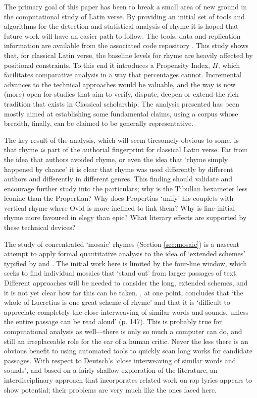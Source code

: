 \documentclass[twocolumn, switch, a4paper]{article} %
\begin{document}
The primary goal of this paper has been to break a small area of new ground in
the computational study of Latin verse. By providing an initial set of tools
and algorithms for the detection and statistical analysis of rhyme it is hoped
that future work will have an easier path to follow. The tools, data and
replication information are available from the associated code repository
\cite{nagy_rhyme_2021}. This study shows that, for classical Latin verse, the
baseline levels for rhyme are heavily affected by positional constraints. To
this end it introduces a Propensity Index, $\Pi$, which facilitates
comparative analysis in a way that percentages cannot. Incremental advances to
the technical approaches would be valuable, and the way is now (more) open for
studies that aim to verify, dispute, deepen or extend the rich tradition that
exists in Classical scholarship. The analysis presented has been mostly aimed
at establishing some fundamental claims, using a corpus whose breadth, finally,
can be claimed to be generally representative.

The key result of the analysis, which will seem tiresomely obvious to some, is
that rhyme \emph{is} part of the authorial fingerprint for classical Latin
verse. Far from the idea that authors avoided rhyme, or even the idea that
`rhyme simply happened by chance' it is clear that rhyme was used differently
by different authors and differently in different genres. This finding should
validate and encourage further study into the particulars; why is the Tibullan
hexameter less leonine than the Propertian? Why does Propertius `unify' his
couplets with vertical rhyme where Ovid is more inclined to link them? Why is
line-initial rhyme more favoured in elegy than epic? What literary effects are
supported by these technical devices? 

The study of concentrated `mosaic' rhymes (Section \ref{sec:mosaic}) is a
nascent attempt to apply formal quantitative analysis to the idea of `extended
schemes' typified by  and .
 The initial work here is limited by the four-line window, which seeks to find
individual mosaics that `stand out' from larger passages of text. Different
approaches will be needed to consider the long, extended schemes, and it is
not yet clear how far this can be taken. , at one
point, concludes that `the whole of Lucretius is one great scheme of rhyme'
and that it is `difficult to appreciate completely the close interweaving of
similar words and sounds, unless the entire passage can be read aloud' (p.
147). This is probably true for computational analysis as well---there is only
so much a computer can do, and still an irreplaceable role for the ear of a
human critic. Never the less there is an obvious benefit to using automated
tools to quickly scan long works for candidate passages. With respect to
Deutsch's `close interweaving of similar words and sounds', and based on a
fairly shallow exploration of the literature, an interdisciplinary approach
that incorporates related work on rap lyrics appears to show potential; their
problems are very much like the ones faced here.
\end{document}
